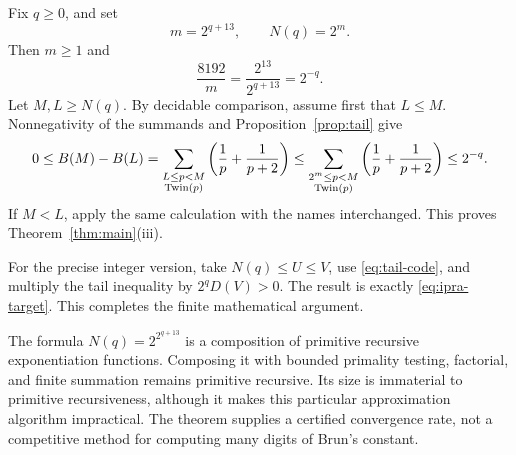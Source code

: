 Fix \(q\ge0\), and set
\[
 m=2^{q+13},\qquad N(q)=2^m.
\]
Then \(m\ge1\) and
\begin{equation}
 \frac{8192}{m}
 =\frac{2^{13}}{2^{q+13}}
 =2^{-q}.
 \label{eq:modulus-arithmetic}
\end{equation}
Let \(M,L\ge N(q)\). By decidable comparison, assume first that \(L\le M\).
Nonnegativity of the summands and Proposition~\ref{prop:tail} give
\[
 0\le B(M)-B(L)
 =\sum_{\substack{L\le p<M\\\operatorname{Twin}(p)}}
       \left(\frac1p+\frac1{p+2}\right)
 \le\sum_{\substack{2^m\le p<M\\\operatorname{Twin}(p)}}
       \left(\frac1p+\frac1{p+2}\right)
 \le2^{-q}.
\]
If \(M<L\), apply the same calculation with the names interchanged.
This proves Theorem~\ref{thm:main}(iii).

For the precise integer version, take \(N(q)\le U\le V\), use
\eqref{eq:tail-code}, and multiply the tail inequality by
\(2^qD(V)>0\). The result is exactly \eqref{eq:ipra-target}.
This completes the finite mathematical argument.

\begin{remark}
The formula \(N(q)=2^{2^{q+13}}\) is a composition of primitive recursive
exponentiation functions. Composing it with bounded primality testing,
factorial, and finite summation remains primitive recursive.
Its size is immaterial to primitive recursiveness, although it makes this
particular approximation algorithm impractical.
The theorem supplies a certified convergence rate, not a competitive
method for computing many digits of Brun's constant.
\end{remark}
